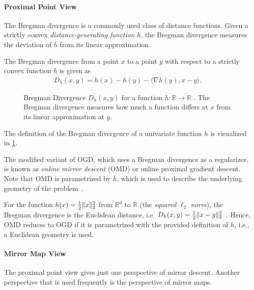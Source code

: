 \paragraph{Proximal Point View} The Bregman divergence is a commonly used class of distance functions. Given a strictly convex \emph{distance-generating function} $h$, the Bregman divergence measures the deviation of $h$ from its linear approximation.

\begin{definition}
\cite{Chen2018} The Bregman divergence from a point $x$ to a point $y$ with respect to a strictly convex function $h$ is given as \begin{align*}
    D_h(x,y) = h(x) - h(y) - \langle\nabla h(y), x - y\rangle.
\end{align*}
\end{definition}

\begin{figure}
    \centering
    
    \caption{Bregman Divergence $D_h(x,y)$ for a function $h : \mathbb{R} \to \mathbb{R}$ \cite{Chen2018}. The Bregman divergence measures how much a function differs at $x$ from its linear approximation at $y$.}
    \label{fig:bregman_divergence}
\end{figure}

The definition of the Bregman divergence of a univariate function $h$ is visualized in \cref{fig:bregman_divergence}.

The modified variant of OGD, which uses a Bregman divergence as a regularizer, is known as \emph{online mirror descent} (OMD) or online proximal gradient descent. Note that OMD is parametrized by $h$, which is used to describe the underlying geometry of the problem~\cite{Chen2018}.

For the function $h(x) = \frac{1}{2} \lVert x\rVert_2^2$ from $\mathbb{R}^d$ to $\mathbb{R}$ (the \emph{squared $\ell_2$ norm}), the Bregman divergence is the Euclidean distance, i.e. $D_h(x,y) = \frac{1}{2} \lVert x-y\rVert_2^2$~\cite{Chen2018}. Hence, OMD reduces to OGD if it is parametrized with the provided definition of $h$, i.e., a Euclidean geometry is used.

\paragraph{Mirror Map View} The proximal point view gives just one perspective of mirror descent. Another perspective that is used frequently is the perspective of mirror maps.


